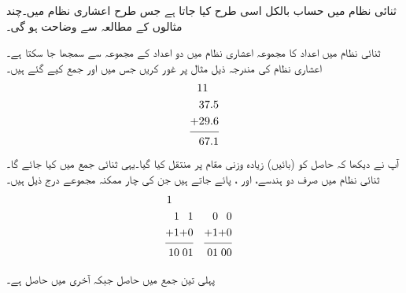 	ثنائی نظام میں حساب بالکل اسی طرح کیا جاتا ہے جس طرح اعشاری نظام میں۔چند مثالوں کے مطالعہ سے  وضاحت ہو گی۔
	
	ثنائی نظام میں اعداد کا  مجموعہ  اعشاری نظام میں دو اعداد کے مجموعہ سے سمجھا جا سکتا ہے۔اعشاری نظام کی مندرجہ ذیل مثال پر غور کریں جس میں  اور      جمع کیے گئے ہیں۔
\begin{align*}
\begin{split}
11\phantom{.1\,}&\\
37.5&\\
+29.6&\\
\noalign{\smallskip}\hline\noalign{\smallskip}
67.1&
\end{split}
\end{align*}
آپ نے دیکھا کہ    حاصل  کو  (بائیں)   زیادہ  وزنی  مقام پر منتقل کیا   گیا۔یہی    ثنائی  جمع   میں کیا جائے گا۔ ثنائی نظام میں صرف دو ہندسے،   اور ، پائے جاتے ہیں جن  کی چار ممکنہ  مجموعے درج ذیل ہیں۔
\begin{align*}
\begin{split}
1\phantom{1\,}&\\
1&\\
+1&\\
\noalign{\smallskip}\hline\noalign{\smallskip}
10&
\end{split}&
\begin{split}
&\\
&1\\
+&0\\
\noalign{\smallskip}\hline\noalign{\smallskip}
0&1
\end{split}&
\begin{split}
&\\
&0\\
+&1\\
\noalign{\smallskip}\hline\noalign{\smallskip}
0&1
\end{split}&
\begin{split}
&\\
&0\\
+&0\\
\noalign{\smallskip}\hline\noalign{\smallskip}
0&0
\end{split}
\end{align*}


پہلی تین جمع   میں حاصل   جبکہ آخری میں حاصل   ہے۔

